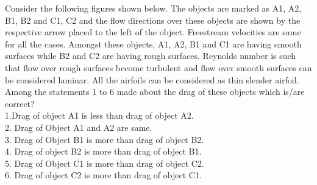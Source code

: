 \iffalse
\title{Assignment}
\author{EE24BTECH11038}
\section{xe}
\chapter{2016}
\fi
\item Consider the following figures shown below. The objects are marked as A1, A2, B1, B2 and C1, C2 and the flow directions over these objects are shown by the respective arrow placed to the left of the object. Freestream velocities are same for all the cases. Amongst these objects, A1, A2, B1 and C1 are having smooth surfaces while B2 and C2 are having rough surfaces. Reynolds number is such
that flow over rough surfaces become turbulent and flow over smooth surfaces can be considered laminar. All the airfoils can be considered as thin slender airfoil. Among the statements 1 to 6 made about the drag of these objects which is/are correct?\\
1.Drag of object A1 is less than drag of object A2.\\
2. Drag of Object A1 and A2 are same.\\
3. Drag of Object B1 is more than drag of object B2.\\
4. Drag of object B2 is more than drag of object B1.\\
5. Drag of Object C1 is more than drag of object C2.\\
6. Drag of object C2 is more than drag of object C1.

